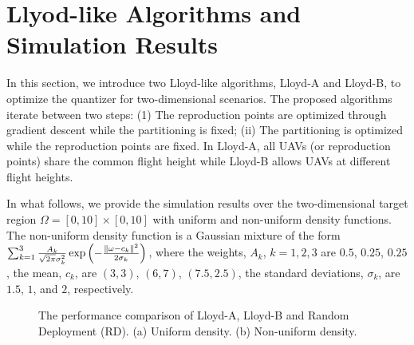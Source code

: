 \documentclass[12pt,onecolumn,final,letterpaper]{IEEEtran}
\begin{document}
\section{Llyod-like Algorithms and Simulation Results}
%
In this section, we introduce two Lloyd-like algorithms, Lloyd-A and Lloyd-B, to optimize the quantizer for
two-dimensional scenarios. The proposed
algorithms iterate between two steps: (1) The reproduction points are optimized through gradient descent while the
partitioning is fixed; (ii) The partitioning is optimized while the reproduction points are fixed.  In Lloyd-A, all UAVs
(or reproduction points) share the common flight height while Lloyd-B allows UAVs at different flight heights.

In what follows, we provide the simulation results over the two-dimensional target region $\Omega=[0,10]\times[0,10]$ with
uniform and non-uniform density functions.  The non-uniform density function is a Gaussian mixture of the form
$\sum_{k=1}^{3}\frac{A_k}{\sqrt{2\pi}\sigma^2_k}\exp{\left(-\frac{\|\ensuremath{\omega}-c_k\|^2}{2\sigma_k}\right)}$, where the
weights, $A_k$, $k=1,2,3$ are $0.5$, $0.25$, $0.25$, the mean, $c_k$, are $(3,3)$, $(6,7)$, $(7.5,2.5)$, the standard deviations,
$\sigma_k$, are  $1.5$, $1$, and $2$, respectively.


\begin{figure}[!htb]
\setlength\abovecaptionskip{0pt}
\setlength\belowcaptionskip{0pt}
\centering
{}
\hfil
{}
\captionsetup{justification=justified}
\caption{\small{The performance comparison of Lloyd-A, Lloyd-B and Random Deployment (RD). 
(a) Uniform density. (b) Non-uniform density.}}
\label{Distortion}
\end{figure}
\end{document}
